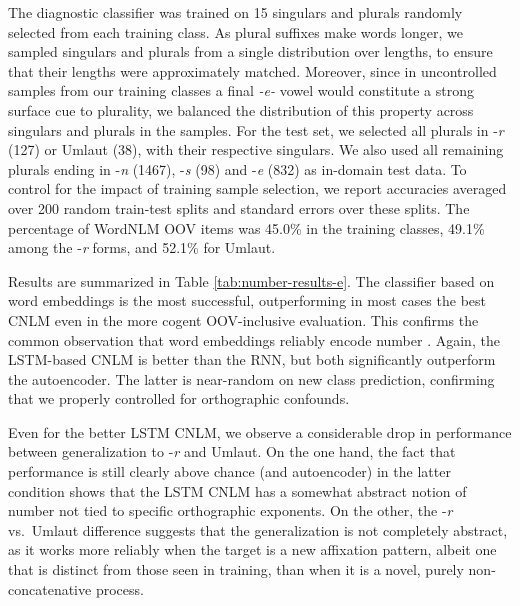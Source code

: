 The diagnostic classifier was trained on 15 singulars and plurals
randomly selected from each training class.  As plural suffixes make
words longer, we sampled singulars and
plurals %
from a single distribution over lengths, to ensure that their lengths
were approximately matched. Moreover, since in uncontrolled samples
from our training classes a final \emph{-e-} vowel would constitute a
strong surface cue to plurality, we balanced the distribution of this
property across singulars and plurals in the samples. For the test
set, we selected all plurals in -\emph{r} (127) or Umlaut (38), with
their respective singulars. %
We also used all remaining plurals ending in -\emph{n} (1467),
-\emph{s} (98) and -\emph{e} (832) as in-domain test data.
To control for the impact of training sample selection, we report
accuracies averaged over 200 random train-test splits and
standard errors over these splits. %
The percentage of WordNLM OOV items was 45.0\% in the training classes,
49.1\% among the -\emph{r} forms, and 52.1\% for Umlaut.

Results are summarized in Table \ref{tab:number-results-e}. The
classifier based on word embeddings is the most successful,
outperforming in most cases the best CNLM even in the more cogent
OOV-inclusive evaluation. This confirms the common observation that
word embeddings reliably encode number
\cite{Mikolov:etal:2013a}. Again, the LSTM-based CNLM is better than
the RNN, but both significantly outperform the autoencoder. The latter
is near-random on new class prediction, confirming that we properly
controlled for orthographic confounds.

Even for the better LSTM CNLM, we observe a considerable drop in
performance between generalization to -\emph{r} and Umlaut. On the one
hand, the fact that performance is still clearly above chance (and
autoencoder) in the latter condition shows that the LSTM CNLM has a
somewhat abstract notion of number not tied to specific orthographic
exponents. On the other, the -\emph{r} vs.~Umlaut difference suggests
that the generalization is not completely abstract, as it works more
reliably when the target is a new affixation pattern, albeit one that
is distinct from those seen in training, than when it is a novel,
purely non-concatenative process.

